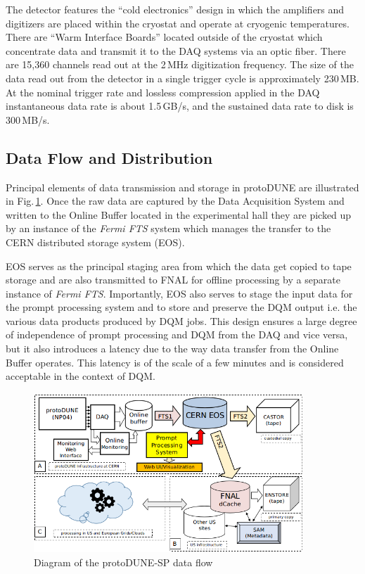 \documentclass{webofc}
\newcommand{\pd}{protoDUNE\xspace}
\begin{document}
The detector features the ``cold electronics'' design in which the amplifiers and digitizers
are placed within the cryostat and operate at cryogenic temperatures. There are
``Warm Interface Boards'' located outside of the cryostat which concentrate data
and transmit it to the DAQ systems via an optic fiber.
There are 15,360 channels read out at the 2\,MHz digitization frequency. The size of the data
read out from the detector in a single trigger cycle is approximately 230\,MB. At the nominal
trigger rate and lossless compression applied in the DAQ instantaneous data rate is about
1.5\,GB/s, and the sustained data rate to disk is 300\,MB/s.

\subsection{Data Flow and Distribution}
Principal elements of data transmission and storage in \pd are illustrated in Fig.\,\ref{fig:dataflow}.
Once the raw data are captured by the Data Acquisition System and written to the Online Buffer
located in the experimental hall  they are picked up by an instance of the \textit{Fermi FTS} system
\cite{sam,fts} which manages the transfer to the CERN distributed storage system (EOS).

EOS serves as the principal staging area  \cite{eos_role} from which the data get copied to tape storage and
are also transmitted to FNAL for offline processing by a separate instance of \textit{Fermi FTS}.
Importantly, EOS also serves to stage the input data for the prompt processing system and to
store and preserve the DQM output i.e. the various data products produced by DQM jobs. This design
ensures a large degree of independence of prompt processing and DQM from the DAQ and vice versa,
but it also introduces a latency due to the way data transfer from the Online Buffer operates. This latency
is of the scale of a few minutes and is considered acceptable in the context of DQM.

\begin{figure}[tb]
\centering\includegraphics[width=0.9\textwidth]{figures/protoDUNE_data_flow_2018_v1.png}
\caption{\label{fig:dataflow}Diagram of the protoDUNE-SP data flow}
\end{figure}
\end{document}
